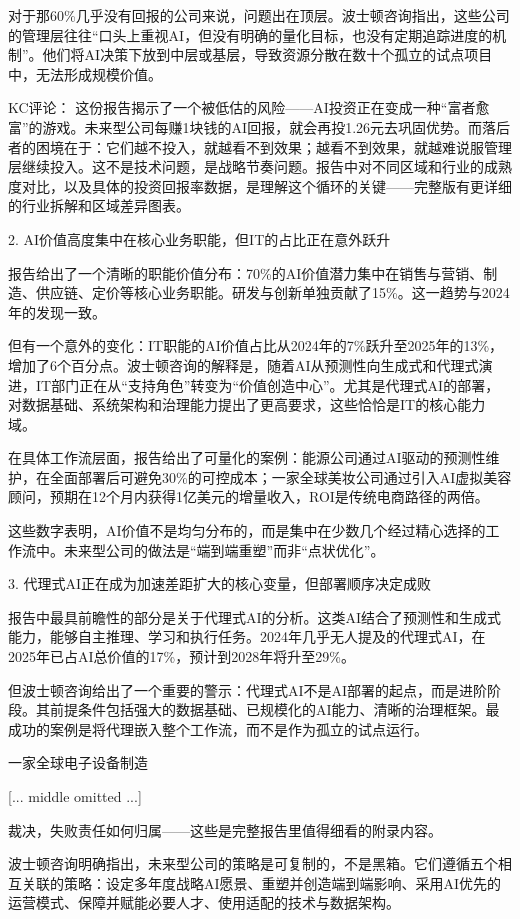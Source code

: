 \documentclass[11pt]{ctexart}
\begin{document}
对于那60\%几乎没有回报的公司来说，问题出在顶层。波士顿咨询指出，这些公司的管理层往往“口头上重视AI，但没有明确的量化目标，也没有定期追踪进度的机制”。他们将AI决策下放到中层或基层，导致资源分散在数十个孤立的试点项目中，无法形成规模价值。

KC评论： 这份报告揭示了一个被低估的风险——AI投资正在变成一种“富者愈富”的游戏。未来型公司每赚1块钱的AI回报，就会再投1.26元去巩固优势。而落后者的困境在于：它们越不投入，就越看不到效果；越看不到效果，就越难说服管理层继续投入。这不是技术问题，是战略节奏问题。报告中对不同区域和行业的成熟度对比，以及具体的投资回报率数据，是理解这个循环的关键——完整版有更详细的行业拆解和区域差异图表。

2. AI价值高度集中在核心业务职能，但IT的占比正在意外跃升

报告给出了一个清晰的职能价值分布：70\%的AI价值潜力集中在销售与营销、制造、供应链、定价等核心业务职能。研发与创新单独贡献了15\%。这一趋势与2024年的发现一致。

但有一个意外的变化：IT职能的AI价值占比从2024年的7\%跃升至2025年的13\%，增加了6个百分点。波士顿咨询的解释是，随着AI从预测性向生成式和代理式演进，IT部门正在从“支持角色”转变为“价值创造中心”。尤其是代理式AI的部署，对数据基础、系统架构和治理能力提出了更高要求，这些恰恰是IT的核心能力域。

在具体工作流层面，报告给出了可量化的案例：能源公司通过AI驱动的预测性维护，在全面部署后可避免30\%的可控成本；一家全球美妆公司通过引入AI虚拟美容顾问，预期在12个月内获得1亿美元的增量收入，ROI是传统电商路径的两倍。

这些数字表明，AI价值不是均匀分布的，而是集中在少数几个经过精心选择的工作流中。未来型公司的做法是“端到端重塑”而非“点状优化”。

3. 代理式AI正在成为加速差距扩大的核心变量，但部署顺序决定成败

报告中最具前瞻性的部分是关于代理式AI的分析。这类AI结合了预测性和生成式能力，能够自主推理、学习和执行任务。2024年几乎无人提及的代理式AI，在2025年已占AI总价值的17\%，预计到2028年将升至29\%。

但波士顿咨询给出了一个重要的警示：代理式AI不是AI部署的起点，而是进阶阶段。其前提条件包括强大的数据基础、已规模化的AI能力、清晰的治理框架。最成功的案例是将代理嵌入整个工作流，而不是作为孤立的试点运行。

一家全球电子设备制造

[... middle omitted ...]

裁决，失败责任如何归属——这些是完整报告里值得细看的附录内容。

波士顿咨询明确指出，未来型公司的策略是可复制的，不是黑箱。它们遵循五个相互关联的策略：设定多年度战略AI愿景、重塑并创造端到端影响、采用AI优先的运营模式、保障并赋能必要人才、使用适配的技术与数据架构。
\end{document}

